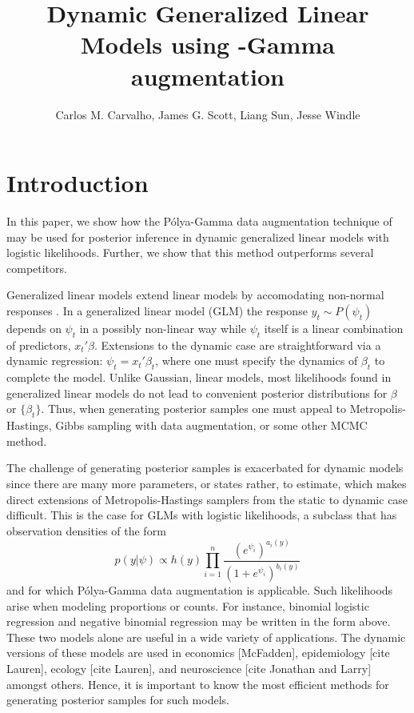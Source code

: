 \documentclass[11pt]{article}
\title{Dynamic Generalized Linear Models using \Polya-Gamma augmentation}
\author{Carlos M. Carvalho, James G. Scott, Liang Sun, Jesse Windle}
\newcommand{\Polya}{P\'{o}lya}
\begin{document}
\maketitle
\tableofcontents

\newpage

\section{Introduction}

In this paper, we show how the \Polya-Gamma data augmentation technique of
\cite{polson-etal-2012} may be used for posterior inference in dynamic
generalized linear models with logistic likelihoods.  Further, we show that this
method outperforms several competitors.

Generalized linear models extend linear models by accomodating non-normal
responses \citep{mccullagh-nelder-1989}.  In a generalized linear model (GLM)
the response $y_t \sim P(\psi_t)$ depends on $\psi_t$ in a possibly non-linear
way while $\psi_t$ itself is a linear combination of predictors, $x_t' \beta$.
Extensions to the dynamic case are straightforward via a dynamic regression:
$\psi_t = x_t' \beta_t$, where one must specify the dynamics of $\beta_t$ to
complete the model.  Unlike Gaussian, linear models, most likelihoods found in
generalized linear models do not lead to convenient posterior distributions for
$\beta$ or $\{\beta_t\}$.  Thus, when generating posterior samples one must
appeal to Metropolis-Hastings, Gibbs sampling with data augmentation, or some
other MCMC method.  

The challenge of generating posterior samples is exacerbated for dynamic models
since there are many more parameters, or states rather, to estimate, which makes
direct extensions of Metropolis-Hastings samplers from the static to dynamic
case difficult.  This is the case for GLMs with logistic likelihoods, a subclass
that has observation densities of the form
\[
p(y | \psi) \propto h(y) \prod_{i=1}^n
\frac{(e^{\psi_i})^{a_i(y)}}{(1+e^{\psi_i})^{b_i(y)}}
\]
and for which \Polya-Gamma data augmentation is applicable.  Such likelihoods
arise when modeling proportions or counts.  For instance, binomial logistic
regression and negative binomial regression may be written in the form above.
These two models alone are useful in a wide variety of applications.  The
dynamic versions of these models are used in economics [McFadden], epidemiology
[cite Lauren], ecology [cite Lauren], and neuroscience [cite Jonathan and Larry]
amongst others.  Hence, it is important to know the most efficient methods for
generating posterior samples for such models.
\end{document}
